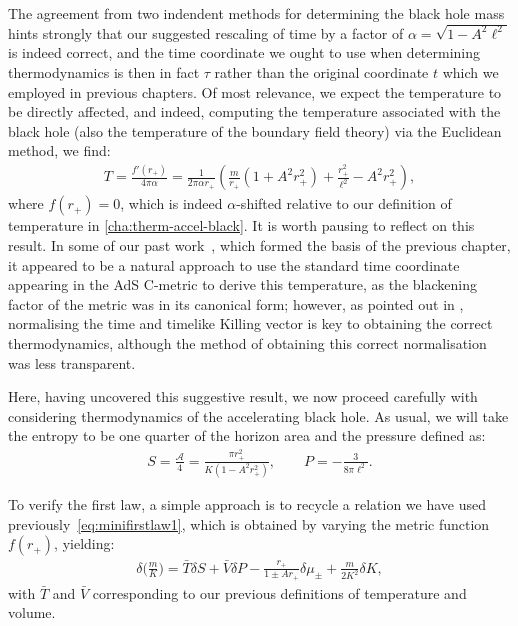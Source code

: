 \documentclass[
twoside,
openright,
frontopenright,
]{dmathesis}
\newcommand{\todoopt}[2][]{\todo[color=blue!20,size=\footnotesize,#1]{#2}}
\newcommand{\tcr}{\textcolor{red}}
\begin{document}
The agreement from two indendent methods for determining the black hole mass
hints strongly that our suggested rescaling of time by a factor of $\alpha =
\sqrt{1-A^2\ell^2}$ is indeed correct, and the time coordinate we ought to use
when determining thermodynamics is then in fact $\tau$ rather than the original
coordinate $t$ which we employed in previous chapters. Of most relevance, we
expect the temperature to be directly affected, and indeed, computing the
temperature associated with the black hole (also the temperature of the boundary
field theory) via the Euclidean method, we find:
\begin{align}
  T=\frac{f'(r_+)}{4\pi\alpha} = \frac{1}{2\pi \alpha r_+}\left(\frac{m}{r_+}\left(1+A^2r_+^2
\right) + \frac{r_+^2}{\ell^2} - A^2 r_+^2\right),
  \label{temp}
\end{align}
where $f(r_+)=0$, which is indeed $\alpha$-shifted relative to our definition of
temperature in \cref{cha:therm-accel-black}. It is worth pausing to reflect on
this result. In some of our past
work~\cite{Appels:2016uha,Appels:2017xoe,Gregory:2017ogk}, which formed the
basis of the previous chapter, it appeared to be a natural approach to use the
standard time coordinate appearing in the AdS C-metric to derive this
temperature, as the blackening factor of the metric was in its canonical form;
however, as pointed out in \cite{Gibbons:2004ai}, normalising the time and
timelike Killing vector is key to obtaining the correct thermodynamics, although
the method of obtaining this correct normalisation was less transparent.

Here, having uncovered this suggestive result, we now proceed carefully with
considering thermodynamics of the accelerating black hole. As usual, we will
take the entropy to be one quarter of the horizon area and the pressure defined as:
\begin{align}
S=\frac{\mathcal{A}}{4}=\frac{\pi r_+^2}{K(1-A^2r_+^2)}, \qquad P=-\frac{3}{8\pi\ell^2}.
\label{entropy}
\end{align}

To verify the first law, a simple approach is to recycle a relation we have used
previously~\eqref{eq:minifirstlaw1}\todoopt{better ref}, which is obtained by
varying the metric function $f(r_+)$, yielding:
\begin{align}
  \label{eq:deltamK}
  \delta \Big(\frac{m}{K}\Big) = \bar{T} \delta S + \bar{V} \delta P -
  \frac{r_+}{1\pm Ar_+}\delta \mu_\pm + \frac{m}{2K^2}\delta K,
\end{align}
with $\bar{T}$ and $\bar{V}$ corresponding to our previous definitions of
temperature and volume\todoopt{ref back to T and V}.
\end{document}

